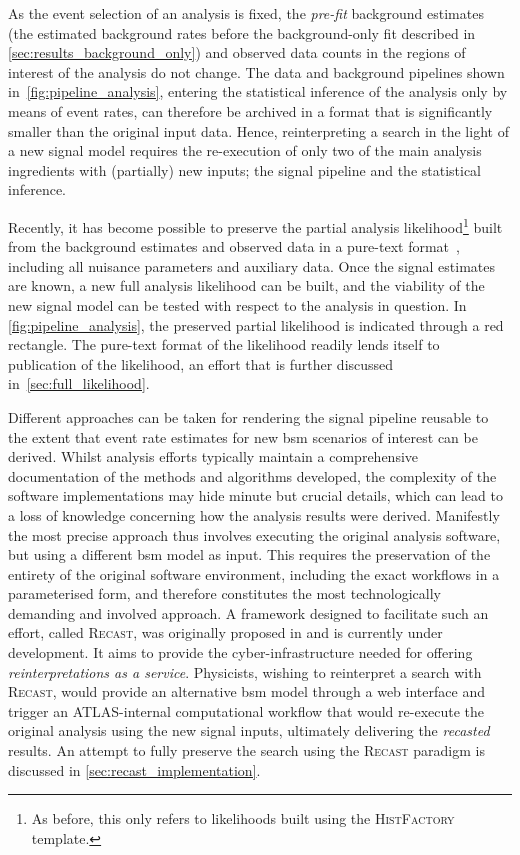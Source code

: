 As the event selection of an analysis is fixed, the \textit{pre-fit} background estimates (\ie the estimated background rates before the background-only fit described in \cref{sec:results_background_only}) and observed data counts in the regions of interest of the analysis do not change.
The data and background pipelines shown in~\cref{fig:pipeline_analysis}, entering the statistical inference of the analysis only by means of event rates, can therefore be archived in a format that is significantly smaller than the original input data.
Hence, reinterpreting a search in the light of a new signal model requires the re-execution of only two of the main analysis ingredients with (partially) new inputs; the signal pipeline and the statistical inference.

Recently, it has become possible to preserve the partial analysis likelihood\footnote{As before, this only refers to likelihoods built using the \textsc{HistFactory} template.} built from the background estimates and observed data in a pure-text format~\cite{ATL-PHYS-PUB-2019-029}, including all nuisance parameters and auxiliary data. Once the signal estimates are known, a new full analysis likelihood can be built, and the viability of the new signal model can be tested with respect to the analysis in question. In \cref{fig:pipeline_analysis}, the preserved partial likelihood is indicated through a red rectangle. The pure-text format of the likelihood readily lends itself to publication of the likelihood, an effort that is further discussed in~\cref{sec:full_likelihood}.

Different approaches can be taken for rendering the signal pipeline reusable to the extent that event rate estimates for new \gls{bsm} scenarios of interest can be derived. 
Whilst analysis efforts typically maintain a comprehensive documentation of the methods and algorithms developed, the complexity of the software implementations may hide minute but crucial details, which can lead to a loss of knowledge concerning how the analysis results were derived.
Manifestly the most precise approach thus involves executing the original analysis software, but using a different \gls{bsm} model as input.
This requires the preservation of the entirety of the original software environment, including the exact workflows in a parameterised form, and therefore constitutes the most technologically demanding and involved approach. A framework designed to facilitate such an effort, called \textsc{Recast}, was originally proposed in \cite{RECAST_cranmer} and is currently under development. It aims to provide the cyber-infrastructure needed for offering \textit{reinterpretations as a service}. 
Physicists, wishing to reinterpret a search with \textsc{Recast}, would provide an alternative \gls{bsm} model through a web interface and trigger an ATLAS-internal computational workflow that would re-execute the original analysis using the new signal inputs, ultimately delivering the \textit{recasted} results. An attempt to fully preserve the \onelepton search using the \textsc{Recast} paradigm is discussed in \cref{sec:recast_implementation}. 

